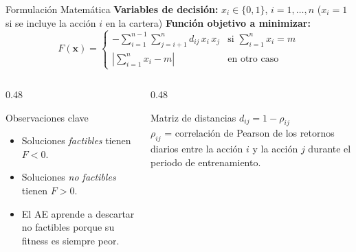 \documentclass[aspectratio=169]{beamer}
\begin{document}
\begin{frame}{Formulación Matemática}
  \textbf{Variables de decisión:} $x_i \in \{0,1\}$, $i = 1,\ldots,n$
  \quad ($x_i = 1$ si se incluye la acción $i$ en la cartera)
  \textbf{Función objetivo a minimizar:}
  \[
    F(\mathbf{x}) =
    \begin{cases}
      -\displaystyle\sum_{i=1}^{n-1}\sum_{j=i+1}^{n} d_{ij}\,x_i\,x_j
        & \text{si } \displaystyle\sum_{i=1}^{n} x_i = m \\[10pt]
      \displaystyle\left|\sum_{i=1}^{n} x_i - m\right|
        & \text{en otro caso}
    \end{cases}
  \]

  \vspace{8pt}
  \begin{columns}[T]
    \begin{column}{0.48\textwidth}
      \begin{alertblock}{Observaciones clave}
        \begin{itemize}
          \item Soluciones \emph{factibles} tienen $F < 0$.
          \item Soluciones \emph{no factibles} tienen $F > 0$.
          \item El AE aprende a descartar no factibles porque su
                fitness es siempre peor.
        \end{itemize}
      \end{alertblock}
    \end{column}
    \begin{column}{0.48\textwidth}
      \begin{block}{Matriz de distancias}
        $d_{ij} = 1 - \rho_{ij}$\\[4pt]
        $\rho_{ij}$ = correlación de Pearson de los retornos diarios
        entre la acción $i$ y la acción $j$ durante el periodo de
        entrenamiento.
      \end{block}
    \end{column}
  \end{columns}
\end{frame}
\end{document}
